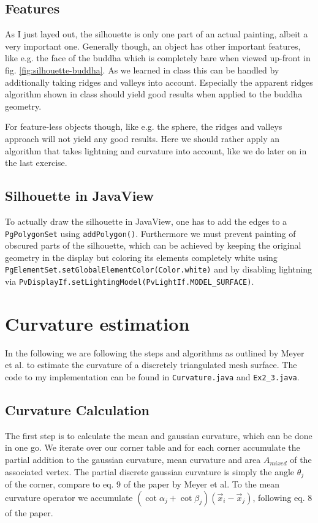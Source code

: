 \documentclass[a4paper,10pt,notitlepage]{scrreprt}
\begin{document}
\section{Features}

As I just layed out, the silhouette is only one part of an actual painting,
albeit a very important one. Generally though, an object has other important
features, like e.g. the face of the buddha which is completely bare when viewed
up-front in fig. \ref{fig:silhouette-buddha}. As we learned in class this can
be handled by additionally taking ridges and valleys into account. Especially
the apparent ridges algorithm shown in class should yield good results when
applied to the buddha geometry.

For feature-less objects though, like e.g. the sphere, the ridges and
valleys approach will not yield any good results. Here we should rather apply
an algorithm that takes lightning and curvature into account, like we do later
on in the last exercise.

\section{Silhouette in JavaView}

To actually draw the silhouette in JavaView, one has to add the edges to a
\texttt{PgPolygonSet} using \texttt{addPolygon()}. Furthermore we must prevent
painting of obscured parts of the silhouette, which can be achieved by
keeping the original geometry in the display but coloring its elements
completely white using \texttt{PgElementSet.setGlobalElementColor(Color.white)}
and by disabling lightning via
\texttt{PvDisplayIf.setLightingModel(PvLightIf.MODEL\_SURFACE)}.

\chapter{Curvature estimation}

In the following we are following the steps and algorithms as outlined by Meyer
et al. to estimate the curvature of a discretely triangulated mesh surface. The
code to my implementation can be found in \texttt{Curvature.java} and
\texttt{Ex2\_3.java}.

\section{Curvature Calculation}

The first step is to calculate the mean and gaussian curvature, which can be
done in one go. We iterate over our corner table and for each corner accumulate
the partial addition to the gaussian curvature, mean curvature and
area $A_{mixed}$ of the associated vertex. The partial discrete gaussian
curvature is simply the angle $\theta_j$ of the corner, compare to eq. 9 of the
paper by Meyer et al. To the mean curvature operator we accumulate $(\cot
\alpha_j + \cot \beta_j) (\vec{x}_i - \vec{x}_j)$, following eq. 8 of the paper.
\end{document}
